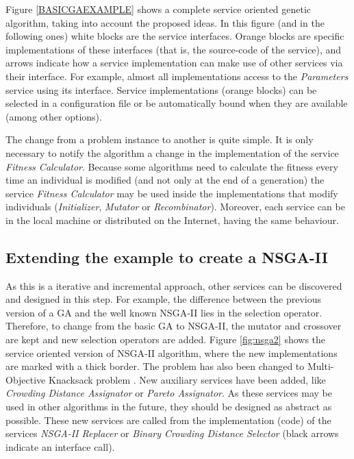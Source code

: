 Figure \ref{BASICGAEXAMPLE} shows a complete service oriented genetic algorithm, taking into account the proposed ideas. In this figure (and in the following ones) white blocks are the service interfaces. Orange blocks are specific implementations of these interfaces (that is, the source-code of the service), and  arrows indicate how a service implementation can make use of other services via their interface. For example, almost all implementations access to the {\em Parameters} service using its interface. Service implementations (orange blocks) can be selected in a configuration file or be automatically bound when they are available (among other options).



 The change from a problem instance to another is quite simple. It is only necessary to notify the algorithm a change in the implementation of the service {\em Fitness Calculator}. Because some algorithms need to calculate the fitness every time an individual is modified (and not only at the end of a generation) the service {\em Fitness Calculator} may be used inside the implementations that modify individuals ({\em Initializer}, {\em Mutator} or {\em Recombinator}). Moreover, each service can be in the local machine or distributed on the Internet, having the same behaviour. %

\subsection{Extending the example to create a NSGA-II}

As this is a iterative and incremental approach, other services can be discovered and designed in this step. For example, the difference between the previous version of a GA and the well known NSGA-II \cite{NSGA2} lies in the selection operator. Therefore, to change from the basic GA to NSGA-II, the mutator and crossover are kept and new selection operators are added. Figure \ref{fig:nsga2} shows the service oriented version of NSGA-II algorithm, where the new implementations are marked with a thick border. The problem has also been changed to Multi-Objective Knacksack problem \cite{MULTIOBJECTIVEKNACKSACK}. New auxiliary services have been added, like {\em Crowding Distance Assignator} or {\em Pareto Assignator}. As these services may be used in other algorithms in the future, they should be designed as abstract as possible. These new services are called from the implementation (code) of the services {\em NSGA-II Replacer} or {\em Binary Crowding Distance Selector} (black arrows indicate an interface call). 




